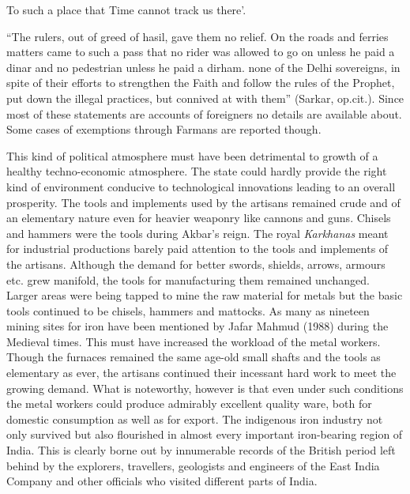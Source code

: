 To such a place that Time cannot track us there’.

“The rulers, out of greed of hasil, gave them no relief. On the roads and ferries matters came to such a pass that no rider was allowed to go on unless he paid a dinar and no pedestrian unless he paid a dirham. none of the Delhi sovereigns, in spite of their efforts to strengthen the Faith and follow the rules of the Prophet, put down the illegal practices, but connived at with them” (Sarkar, op.cit.).  Since most of these statements are accounts of foreigners no details are available about. Some cases of exemptions through Farmans are reported though. 

This kind of political atmosphere must have been detrimental to growth of a healthy techno-economic atmosphere. The state could hardly provide the right kind of environment conducive to technological innovations leading to an overall prosperity.  The tools and implements used by the artisans remained crude and of an elementary nature even for heavier weaponry like cannons and guns. Chisels and hammers were the tools during Akbar’s reign.  The royal {\it Karkhanas} meant for industrial productions barely paid attention to the tools and implements of the artisans.  Although the demand for better swords, shields, arrows, armours etc. grew manifold, the tools for manufacturing them remained unchanged.  Larger areas were being tapped to mine the raw material for metals but the basic tools continued to be chisels, hammers and mattocks.  As many as nineteen mining sites for iron have been mentioned by Jafar Mahmud (1988) during the Medieval times.  This must have increased the workload of the metal workers.  Though the furnaces remained the same age-old small shafts and the tools as elementary as ever, the artisans continued their incessant hard work to meet the growing demand. What is noteworthy, however is that even under such conditions the metal workers could produce admirably excellent quality ware, both for domestic consumption as well as for export. The indigenous iron industry not only survived but also flourished in almost every important iron-bearing region of India. This is clearly borne out by innumerable records of the British period left behind by the explorers, travellers, geologists and engineers of the East India Company and other officials who visited different parts of India.


\theendnotes

\label{endchapter5}
